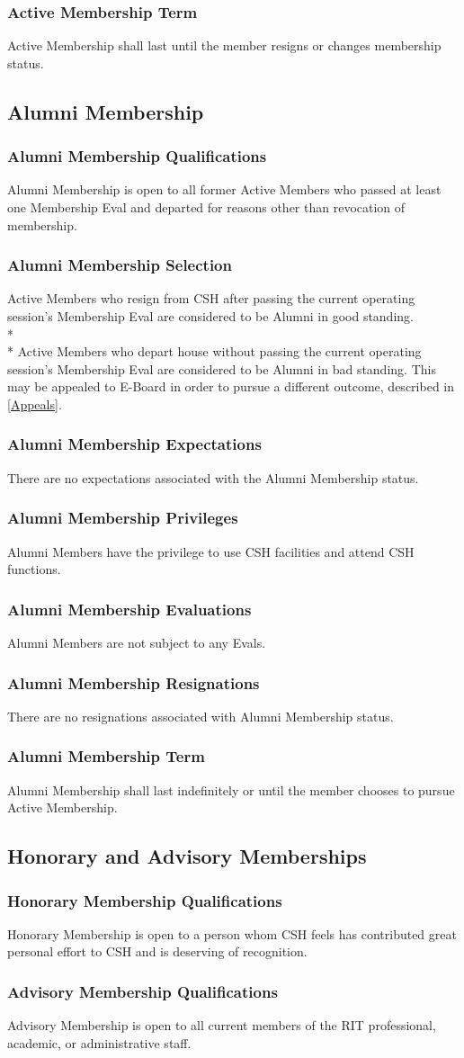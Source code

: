 \documentclass{article}
\newcommand{\asection}[1]{\subsection{#1} \label{#1}}
\newcommand{\asubsection}[1]{\subsubsection{#1} \label{#1}}
\begin{document}
\asubsection{Active Membership Term}
Active Membership shall last until the member resigns or changes membership status.

\asection{Alumni Membership}

\asubsection{Alumni Membership Qualifications}
Alumni Membership is open to all former Active Members who passed at least one Membership Eval and departed for reasons other than revocation of membership.

\asubsection{Alumni Membership Selection}
Active Members who resign from CSH after passing the current operating session's Membership Eval are considered to be Alumni in good standing.
\\*\\*
Active Members who depart house without passing the current operating session's Membership Eval are considered to be Alumni in bad standing.
This may be appealed to E-Board in order to pursue a different outcome, described in \ref{Appeals}.

\asubsection{Alumni Membership Expectations}
There are no expectations associated with the Alumni Membership status.

\asubsection{Alumni Membership Privileges}
Alumni Members have the privilege to use CSH facilities and attend CSH functions.

\asubsection{Alumni Membership Evaluations}
Alumni Members are not subject to any Evals.

\asubsection{Alumni Membership Resignations}
There are no resignations associated with Alumni Membership status.

\asubsection{Alumni Membership Term}
Alumni Membership shall last indefinitely or until the member chooses to pursue Active Membership.

\asection{Honorary and Advisory Memberships}

\asubsection{Honorary Membership Qualifications}
Honorary Membership is open to a person whom CSH feels has contributed great personal effort to CSH and is deserving of recognition.

\asubsection{Advisory Membership Qualifications}
Advisory Membership is open to all current members of the RIT professional, academic, or administrative staff.
\end{document}
